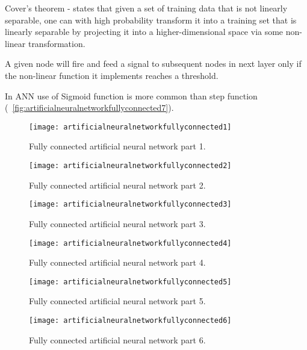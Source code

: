 \begin{numberedlist}
\begin{numberedlist}
			\item Cover's theorem - states that given a set of training data that is not linearly separable, one can with high probability transform it into a training set that is linearly separable by projecting it into a higher-dimensional space via some non-linear transformation.
		\end{numberedlist}
		\item A given node will fire and feed a signal to subsequent nodes in next layer only if the non-linear function it implements reaches a threshold.
		\item In ANN use of Sigmoid function is more common than step function (\figurename~\ref{fig:artificialneuralnetworkfullyconnected7}).
	\end{numberedlist}

 	\begin{figure}[htb]
		\centering
		\texttt{[image: artificialneuralnetworkfullyconnected1]}
		\caption[Fully connected artificial neural network part 1]{Fully connected artificial neural network part 1.}
		\label{fig:artificialneuralnetworkfullyconnected1}
	\end{figure}
 	\begin{figure}[htb]
		\centering
		\texttt{[image: artificialneuralnetworkfullyconnected2]}
		\caption[Fully connected artificial neural network part 2]{Fully connected artificial neural network part 2.}
		\label{fig:artificialneuralnetworkfullyconnected2}
	\end{figure}
 	\begin{figure}[htb]
		\centering
		\texttt{[image: artificialneuralnetworkfullyconnected3]}
		\caption[Fully connected artificial neural network part 3]{Fully connected artificial neural network part 3.}
		\label{fig:artificialneuralnetworkfullyconnected3}
	\end{figure}
 	\begin{figure}[htb]
		\centering
		\texttt{[image: artificialneuralnetworkfullyconnected4]}
		\caption[Fully connected artificial neural network part 4]{Fully connected artificial neural network part 4.}
		\label{fig:artificialneuralnetworkfullyconnected4}
	\end{figure}
 	\begin{figure}[htb]
		\centering
		\texttt{[image: artificialneuralnetworkfullyconnected5]}
		\caption[Fully connected artificial neural network part 5]{Fully connected artificial neural network part 5.}
		\label{fig:artificialneuralnetworkfullyconnected5}
	\end{figure}
 	\begin{figure}[htb]
		\centering
		\texttt{[image: artificialneuralnetworkfullyconnected6]}
		\caption[Fully connected artificial neural network part 6]{Fully connected artificial neural network part 6.}
		\label{fig:artificialneuralnetworkfullyconnected6}
	\end{figure}

